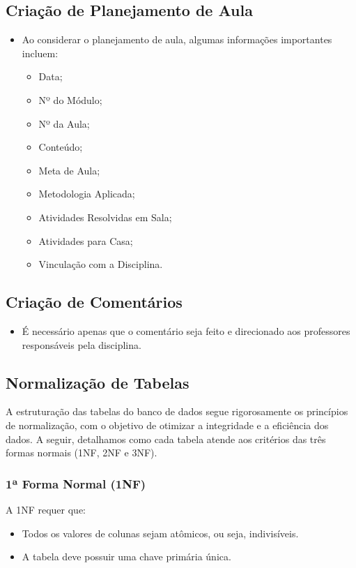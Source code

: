 \documentclass{article}
\begin{document}
\subsection{Criação de Planejamento de Aula}

\begin{itemize}
    \item Ao considerar o planejamento de aula, algumas informações importantes incluem:
    \begin{itemize}
        \item Data;
        \item Nº do Módulo;
        \item Nº da Aula;
        \item Conteúdo;
        \item Meta de Aula;
        \item Metodologia Aplicada;
        \item Atividades Resolvidas em Sala;
        \item Atividades para Casa;
        \item Vinculação com a Disciplina.
    \end{itemize}
\end{itemize}

\subsection{Criação de Comentários}
\begin{itemize}
    \item É necessário apenas que o comentário seja feito e direcionado aos professores responsáveis pela disciplina.
\end{itemize}
\subsection{Normalização de Tabelas}
A estruturação das tabelas do banco de dados segue rigorosamente os princípios de normalização, com o objetivo de otimizar a integridade e a eficiência dos dados. A seguir, detalhamos como cada tabela atende aos critérios das três formas normais (1NF, 2NF e 3NF).

\subsubsection{1ª Forma Normal (1NF)}
A 1NF requer que:
\begin{itemize}
    \item Todos os valores de colunas sejam atômicos, ou seja, indivisíveis.
    \item A tabela deve possuir uma chave primária única.
\end{itemize}
\end{document}
